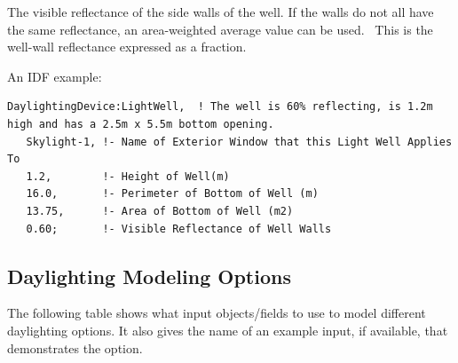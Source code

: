The visible reflectance of the side walls of the well. If the walls do not all have the same reflectance, an area-weighted average value can be used.~ This is the well-wall reflectance expressed as a fraction.

An IDF example:

\begin{lstlisting}
DaylightingDevice:LightWell,  ! The well is 60% reflecting, is 1.2m high and has a 2.5m x 5.5m bottom opening.
   Skylight-1, !- Name of Exterior Window that this Light Well Applies To
   1.2,        !- Height of Well(m)
   16.0,       !- Perimeter of Bottom of Well (m)
   13.75,      !- Area of Bottom of Well (m2)
   0.60;       !- Visible Reflectance of Well Walls
\end{lstlisting}

\subsection{Daylighting Modeling Options}\label{daylighting-modeling-options}

The following table shows what input objects/fields to use to model different daylighting options. It also gives the name of an example input, if available, that demonstrates the option.

